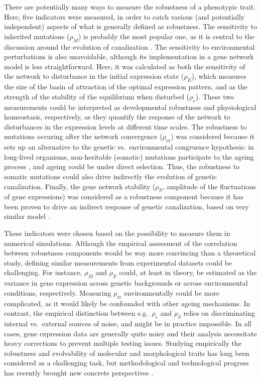 \documentclass[10pt,a4paper]{article}
\newcommand{\stability}{{\rho_S}}
\newcommand{\earlyenv}{{\rho_E}}
\newcommand{\lateenv}{{\rho_e}}
\newcommand{\earlymut}{{\rho_M}}
\newcommand{\latemut}{{\rho_m}}
\begin{document}
There are potentially many ways to measure the robustness of a phenotypic trait. Here, five indicators were measured, in order to catch various (and potentially independent) aspects of what is generally defined as robustness. The sensitivity to inherited mutations ($\earlymut$) is probably the most popular one, as it is central to the discussion around the evolution of canalization \citep{Wad59, Wag96, Far15}. The sensitivity to environmental perturbations is also unavoidable, although its implementation in a gene network model is less straightforward. Here, it was calculated as both the sensitivity of the network to disturbance in the initial expression state ($\earlyenv$), which measures the size of the basin of attraction of the optimal expression pattern, and as the strength of the stability of the equilibrium when disturbed ($\lateenv$). These two measurements could be interpreted as developmental robustness and physiological homeostasis, respectively, as they quantify the response of the network to disturbances in the expression levels at different time scales. The robustness to mutations occuring after the network convergence ($\latemut$) was considered because it sets up an alternative to the genetic vs.\ environmental congruence hypothesis: in long-lived organisms, non-heritable (somatic) mutations participate to the ageing process \citep{KLH12}, and ageing could be under direct selection. Thus, the robustness to somatic mutations could also drive indirectly the evolution of genetic canalization. Finally, the gene network stability ($\stability$, amplitude of the fluctuations of gene expressions) was considered as a robustness component because it has been proven to drive an indirect response of genetic canalization, based on very similar model \citep{SB02}. 

These indicators were chosen based on the possibility to measure them in numerical simulations. Although the empirical assessment of the correlation between robustness components would be way more convincing than a theoretical study, defining similar measurements from experimental datasets could be challenging. For instance, $\earlymut$ and $\earlyenv$ could, at least in theory, be estimated as the variance in gene expression across genetic backgrounds or across environmental conditions, respectively. Measuring $\latemut$ environmentally could be more complicated, as it would likely be confounded with other ageing mechanisms. In contrast, the empirical distinction between e.g.\ $\lateenv$ and $\stability$ relies on discriminating internal vs.\ external sources of noise, and might be in practice impossible. In all cases, gene expression data are generally quite noisy and their analysis necessitate heavy corrections to prevent multiple testing issues. Studying empirically the robustness and evolvability of molecular and morphological traits has long been considered as a challenging task, but methodological and technological progress has recently brought new concrete perspectives \citep{PW19}. 
\end{document}
